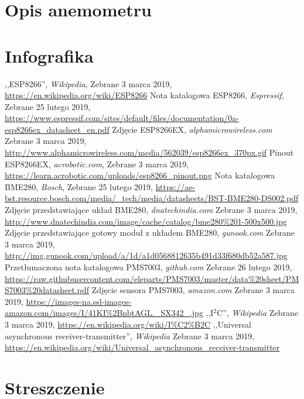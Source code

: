 \documentclass[12pt,a4paper,oneside]{memoir}
\begin{document}
\newpage
\chapter{Opis anemometru} 

\newpage
\chapter{Infografika} 

\newpage
\listoffigures
\newpage
\listoftables
\newpage
\begin{thebibliography}{12}
	,,ESP8266'',
	\textit{Wikipedia},
	Zebrane 3 marca 2019,
	\url{https://en.wikipedia.org/wiki/ESP8266}
	Nota katalogowa ESP8266,
	\textit{Espressif},
	Zebrane 25 lutego 2019,
	\url{https://www.espressif.com/sites/default/files/documentation/0a-esp8266ex_datasheet_en.pdf}
	Zdjęcie ESP8266EX,
	\textit{alphamicrowireless.com}
	Zebrane 3 marca 2019,
	\url{http://www.alphamicrowireless.com/media/562039/esp8266ex_370px.gif}
	Pinout ESP8266EX,
	\textit{acrobotic.com},
	Zebrane 3 marca 2019,
	\url{https://learn.acrobotic.com/uploads/esp8266_pinout.png}
	Nota katalogowa BME280,
	\textit{Bosch},
	Zebrane 25 lutego 2019,
	\url{https://ae-bst.resource.bosch.com/media/_tech/media/datasheets/BST-BME280-DS002.pdf}
	Zdjęcie przedstawiające układ BME280,
	\textit{dnatechindia.com}
	Zebrane 3 marca 2019,
	\url{http://www.dnatechindia.com/image/cache/catalog/bme280\%201-500x500.jpg}
	Zdjęcie przedstawiające gotowy moduł z układem BME280,
	\textit{gunook.com}
	Zebrane 3 marca 2019,
	\url{http://img.gunook.com/upload/a/1d/a1d0568812635b491d33f680db52a587.jpg}
	Przetłumaczona nota katalogowa PMS7003,
	\textit{github.com}
	Zebrane 26 lutego 2019,
	\url{https://raw.githubusercontent.com/eleparts/PMS7003/master/data\%20sheet/PMS7003\%20datasheet.pdf}
	Zdjęcie sensora PMS7003,
	\textit{amazon.com}
	Zebrane 3 marca 2019,
	\url{https://images-na.ssl-images-amazon.com/images/I/41KI\%2BnbtAGL._SX342_.jpg}
	,,I$^2$C'',
	\textit{Wikipedia}
	Zebrane 3 marca 2019,
	\url{https://en.wikipedia.org/wiki/I%C2%B2C}
	,,Universal asynchronous receiver-transmitter'', 
	\textit{Wikipedia}
	Zebrane 3 marca 2019,
	\url{https://en.wikipedia.org/wiki/Universal_asynchronous_receiver-transmitter}	
\end{thebibliography}

\newpage
\chapter{Streszczenie} 
\end{document}
